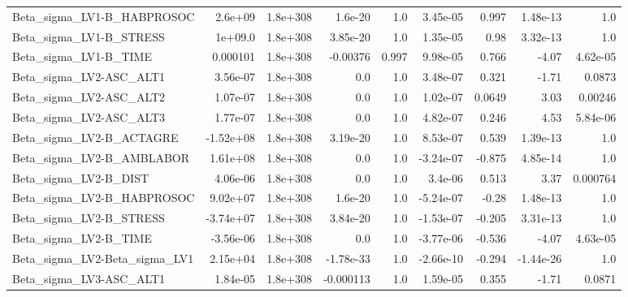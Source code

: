 \begin{tabular}{lrrrrrrrr}
Beta\_sigma\_LV1-B\_HABPROSOC    &     2.6e+09 &     1.8e+308 &   1.6e-20 &      1.0 &   3.45e-05 &       0.997 &     1.48e-13 &           1.0 \\
Beta\_sigma\_LV1-B\_STRESS       &     1e+09.0 &     1.8e+308 &  3.85e-20 &      1.0 &   1.35e-05 &        0.98 &     3.32e-13 &           1.0 \\
Beta\_sigma\_LV1-B\_TIME         &    0.000101 &     1.8e+308 &  -0.00376 &    0.997 &   9.98e-05 &       0.766 &        -4.07 &      4.62e-05 \\
Beta\_sigma\_LV2-ASC\_ALT1       &    3.56e-07 &     1.8e+308 &       0.0 &      1.0 &   3.48e-07 &       0.321 &        -1.71 &        0.0873 \\
Beta\_sigma\_LV2-ASC\_ALT2       &    1.07e-07 &     1.8e+308 &       0.0 &      1.0 &   1.02e-07 &      0.0649 &         3.03 &       0.00246 \\
Beta\_sigma\_LV2-ASC\_ALT3       &    1.77e-07 &     1.8e+308 &       0.0 &      1.0 &   4.82e-07 &       0.246 &         4.53 &      5.84e-06 \\
Beta\_sigma\_LV2-B\_ACTAGRE      &   -1.52e+08 &     1.8e+308 &  3.19e-20 &      1.0 &   8.53e-07 &       0.539 &     1.39e-13 &           1.0 \\
Beta\_sigma\_LV2-B\_AMBLABOR     &    1.61e+08 &     1.8e+308 &       0.0 &      1.0 &  -3.24e-07 &      -0.875 &     4.85e-14 &           1.0 \\
Beta\_sigma\_LV2-B\_DIST         &    4.06e-06 &     1.8e+308 &       0.0 &      1.0 &    3.4e-06 &       0.513 &         3.37 &      0.000764 \\
Beta\_sigma\_LV2-B\_HABPROSOC    &    9.02e+07 &     1.8e+308 &   1.6e-20 &      1.0 &  -5.24e-07 &       -0.28 &     1.48e-13 &           1.0 \\
Beta\_sigma\_LV2-B\_STRESS       &   -3.74e+07 &     1.8e+308 &  3.84e-20 &      1.0 &  -1.53e-07 &      -0.205 &     3.31e-13 &           1.0 \\
Beta\_sigma\_LV2-B\_TIME         &   -3.56e-06 &     1.8e+308 &       0.0 &      1.0 &  -3.77e-06 &      -0.536 &        -4.07 &      4.63e-05 \\
Beta\_sigma\_LV2-Beta\_sigma\_LV1 &    2.15e+04 &     1.8e+308 & -1.78e-33 &      1.0 &  -2.66e-10 &      -0.294 &    -1.44e-26 &           1.0 \\
Beta\_sigma\_LV3-ASC\_ALT1       &    1.84e-05 &     1.8e+308 & -0.000113 &      1.0 &   1.59e-05 &       0.355 &        -1.71 &        0.0871 \\

\end{tabular}
